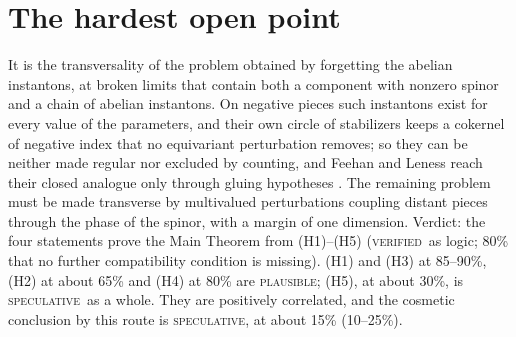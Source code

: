 \documentclass[10pt]{amsart}
\numberwithin{equation}{section}
\theoremstyle{compact}
\newcommand{\ver}{\textsc{verified}}
\newcommand{\pla}{\textsc{plausible}}
\newcommand{\spe}{\textsc{speculative}}
\begin{document}
\section*{The hardest open point}

It is the transversality of the problem obtained by forgetting the abelian
instantons, at broken limits that contain both a component with nonzero spinor
and a chain of abelian instantons. On negative pieces such instantons exist for
every value of the parameters, and their own circle of stabilizers keeps a
cokernel of negative index that no equivariant perturbation removes; so they
can be neither made regular nor excluded by counting, and Feehan and Leness
reach their closed analogue only through gluing hypotheses \cite[Hyps.~7.8.1,
11.3.5]{FLM}. The remaining problem must be made transverse by multivalued
perturbations coupling distant pieces through the phase of the spinor, with a
margin of one dimension. Verdict: the four
statements prove the Main Theorem from (H1)--(H5) (\ver\ as logic; 80\% that no
further compatibility condition is missing). (H1) and (H3) at 85--90\%, (H2) at
about 65\% and (H4) at 80\% are \pla; (H5), at about 30\%, is \spe\ as a whole.
They are positively correlated, and the cosmetic conclusion by this route is
\spe, at about 15\% (10--25\%).
\end{document}

